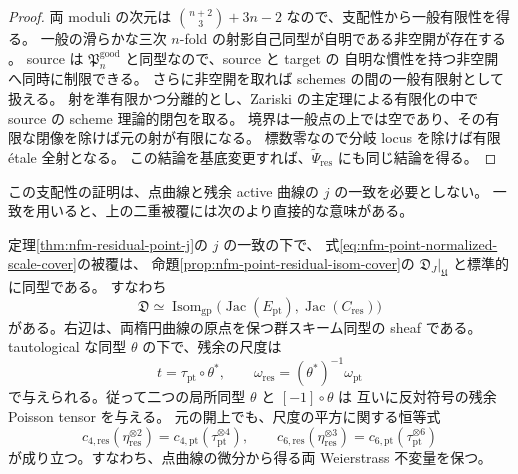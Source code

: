 \begin{proof}
両 moduli の次元は
$\binom{n+2}{3}+3n-2$ なので、支配性から一般有限性を得る。
一般の滑らかな三次 $n$-fold の射影自己同型が自明である非空開が存在する
\cite[Theorem~1.5 and the preceding paragraph]{NFMPoonenAutomorphisms}。
source は $\mathfrak P_n^{\mathrm{good}}$ と同型なので、source と target の
自明な慣性を持つ非空開へ同時に制限できる。
さらに非空開を取れば schemes の間の一般有限射として扱える。
射を準有限かつ分離的とし、Zariski の主定理による有限化の中で
source の scheme 理論的閉包を取る。
境界は一般点の上では空であり、その有限な閉像を除けば元の射が有限になる。
標数零なので分岐 locus を除けば有限 \'etale 全射となる。
この結論を基底変更すれば、$\widetilde\Psi_{\mathrm{res}}$ にも同じ結論を得る。
\end{proof}

この支配性の証明は、点曲線と残余 active 曲線の $j$ の一致を必要としない。
一致を用いると、上の二重被覆には次のより直接的な意味がある。

\begin{proposition}
\label{prop:nfm-point-normalized-jacobian-cover}
定理\ref{thm:nfm-residual-point-j}の $j$ の一致の下で、
式\eqref{eq:nfm-point-normalized-scale-cover}の被覆は、
命題\ref{prop:nfm-point-residual-isom-cover}の $\mathfrak D_J|_{\mathfrak U}$ と標準的に同型である。
すなわち
\[
 \mathfrak D\simeq
 \operatorname{Isom}_{\mathrm{gp}}
 \bigl(\operatorname{Jac}(E_{\mathrm{pt}}),
       \operatorname{Jac}(C_{\mathrm{res}})\bigr)
\]
がある。右辺は、両楕円曲線の原点を保つ群スキーム同型の sheaf である。
tautological な同型 $\theta$ の下で、残余の尺度は
\[
 t=\tau_{\mathrm{pt}}\circ\theta^*,\qquad
 \omega_{\mathrm{res}}=(\theta^*)^{-1}\omega_{\mathrm{pt}}
\]
で与えられる。従って二つの局所同型 $\theta$ と $[-1]\circ\theta$ は
互いに反対符号の残余 Poisson tensor を与える。
元の開上でも、尺度の平方に関する恒等式
\[
 c_{4,\mathrm{res}}(\eta_{\mathrm{res}}^{\otimes2})
   =c_{4,\mathrm{pt}}(\tau_{\mathrm{pt}}^{\otimes4}),\qquad
 c_{6,\mathrm{res}}(\eta_{\mathrm{res}}^{\otimes3})
   =c_{6,\mathrm{pt}}(\tau_{\mathrm{pt}}^{\otimes6})
\]
が成り立つ。すなわち、点曲線の微分から得る両 Weierstrass 不変量を保つ。
\end{proposition}


